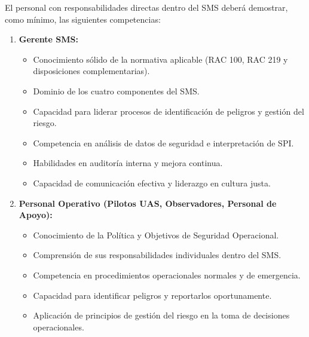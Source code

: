     El personal con responsabilidades directas dentro del SMS deberá demostrar, como mínimo, las siguientes competencias:
    
    \begin{enumerate}
        \item \textbf{Gerente SMS:}
            \begin{itemize}
                \item Conocimiento sólido de la normativa aplicable (RAC 100, RAC 219 y disposiciones complementarias).

                \item Dominio de los cuatro componentes del SMS.

                \item Capacidad para liderar procesos de identificación de peligros y gestión del riesgo.

                \item Competencia en análisis de datos de seguridad e interpretación de SPI.

                \item Habilidades en auditoría interna y mejora continua.

                \item Capacidad de comunicación efectiva y liderazgo en cultura justa.
            \end{itemize}
        \item \textbf{Personal Operativo (Pilotos UAS, Observadores, Personal de Apoyo):}
            \begin{itemize}
                \item Conocimiento de la Política y Objetivos de Seguridad Operacional.

                \item Comprensión de sus responsabilidades individuales dentro del SMS.

                \item Competencia en procedimientos operacionales normales y de emergencia.

                \item Capacidad para identificar peligros y reportarlos oportunamente.

                \item Aplicación de principios de gestión del riesgo en la toma de decisiones operacionales.
            \end{itemize}
    \end{enumerate}
    

